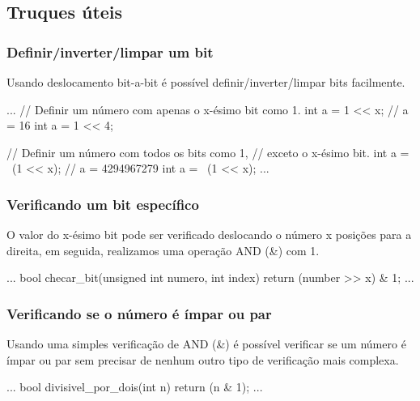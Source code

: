 \subsection{Truques úteis}

\subsubsection{Definir/inverter/limpar um bit}

Usando deslocamento bit-a-bit é possível definir/inverter/limpar bits facilmente.

\begin{excode}
    ...
    // Definir um número com apenas o x-ésimo bit como 1.
    int a = 1 << x;
    // a = 16
    int a = 1 << 4;

    // Definir um número com todos os bits como 1, 
    // exceto o x-ésimo bit.
    int a = ~(1 << x);
    // a = 4294967279
    int a = ~(1 << x);
    ...
\end{excode}

\subsubsection{Verificando um bit específico}

O valor do x-ésimo bit pode ser verificado deslocando o número x posições para a 
direita, em seguida, realizamos uma operação AND (\&) com 1.

\begin{excode}
    ...
    bool checar_bit(unsigned int numero, int index)
    {
        return (number >> x) & 1;
    }
    ...
\end{excode}

\subsubsection{Verificando se o número é ímpar ou par}

Usando uma simples verificação de AND (\&) é possível verificar se um número é ímpar 
ou par sem precisar de nenhum outro tipo de verificação mais complexa.

\begin{excode}
    ...
    bool divisivel_por_dois(int n)
    {
        return (n & 1);
    }
    ...
\end{excode}


